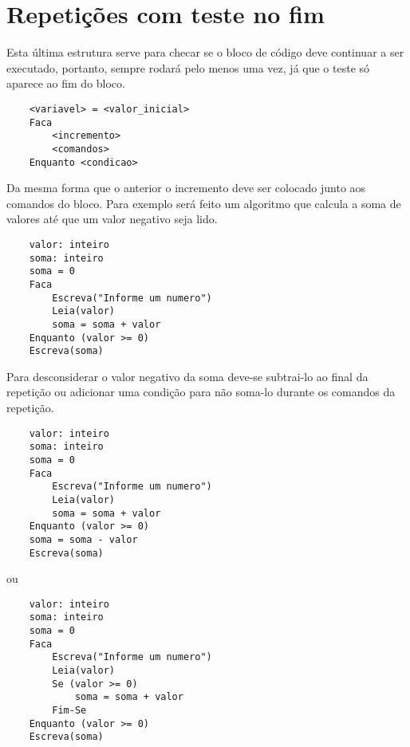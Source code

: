 \section{Repetições com teste no fim}
Esta última estrutura serve para checar se o bloco de código deve continuar a ser executado, portanto, sempre rodará pelo menos uma vez, já que o teste só aparece ao fim do bloco.
\begin{lstlisting}
    <variavel> = <valor_inicial>
    Faca
        <incremento>
        <comandos>
    Enquanto <condicao>
\end{lstlisting}
Da mesma forma que o anterior o incremento deve ser colocado junto aos comandos do bloco. Para exemplo será feito um algoritmo que calcula a soma de valores até que um valor negativo seja lido.
\begin{lstlisting}
    valor: inteiro
    soma: inteiro
    soma = 0
    Faca
        Escreva("Informe um numero")
        Leia(valor)
        soma = soma + valor
    Enquanto (valor >= 0)
    Escreva(soma)
\end{lstlisting}
Para desconsiderar o valor negativo da soma deve-se subtrai-lo ao final da repetição ou adicionar uma condição para não soma-lo durante os comandos da repetição.
\begin{lstlisting}
    valor: inteiro
    soma: inteiro
    soma = 0
    Faca
        Escreva("Informe um numero")
        Leia(valor)
        soma = soma + valor
    Enquanto (valor >= 0)
    soma = soma - valor
    Escreva(soma)
\end{lstlisting}
ou
\begin{lstlisting}
    valor: inteiro
    soma: inteiro
    soma = 0
    Faca
        Escreva("Informe um numero")
        Leia(valor)
        Se (valor >= 0)
            soma = soma + valor
        Fim-Se
    Enquanto (valor >= 0)
    Escreva(soma)
\end{lstlisting}